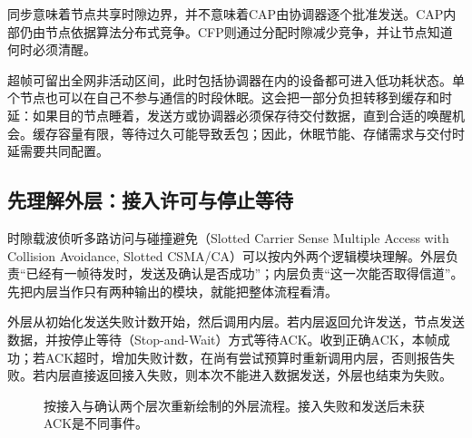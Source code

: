 同步意味着节点共享时隙边界，并不意味着CAP由协调器逐个批准发送。CAP内部仍由节点依据算法分布式竞争。CFP则通过分配时隙减少竞争，并让节点知道何时必须清醒。

超帧可留出全网非活动区间，此时包括协调器在内的设备都可进入低功耗状态。单个节点也可以在自己不参与通信的时段休眠。这会把一部分负担转移到缓存和时延：如果目的节点睡着，发送方或协调器必须保存待交付数据，直到合适的唤醒机会。缓存容量有限，等待过久可能导致丢包；因此，休眠节能、存储需求与交付时延需要共同配置。

\subsection{先理解外层：接入许可与停止等待}

时隙载波侦听多路访问与碰撞避免（Slotted Carrier Sense Multiple Access with Collision Avoidance, Slotted CSMA/CA）可以按内外两个逻辑模块理解。外层负责“已经有一帧待发时，发送及确认是否成功”；内层负责“这一次能否取得信道”。先把内层当作只有两种输出的模块，就能把整体流程看清。

外层从初始化发送失败计数开始，然后调用内层。若内层返回允许发送，节点发送数据，并按停止等待（Stop-and-Wait）方式等待ACK。收到正确ACK，本帧成功；若ACK超时，增加失败计数，在尚有尝试预算时重新调用内层，否则报告失败。若内层直接返回接入失败，则本次不能进入数据发送，外层也结束为失败。

\begin{figure}[htbp]
\centering
{}
\caption{按接入与确认两个层次重新绘制的外层流程。接入失败和发送后未获ACK是不同事件。}
\label{fig:p4-outer}
\end{figure}

